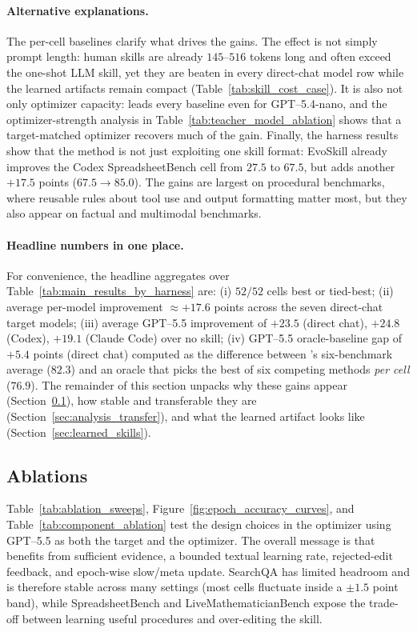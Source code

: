 \paragraph{Alternative explanations.}
The per-cell baselines clarify what drives the gains. The effect is not simply prompt length: human skills are already $145$--$516$ tokens long and often exceed the one-shot LLM skill, yet they are beaten in every direct-chat model row while the learned artifacts remain compact (Table~\ref{tab:skill_cost_case}). It is also not only optimizer capacity: \ourmethod{} leads every baseline even for GPT--5.4-nano, and the optimizer-strength analysis in Table~\ref{tab:teacher_model_ablation} shows that a target-matched optimizer recovers much of the gain. Finally, the harness results show that the method is not just exploiting one skill format: EvoSkill already improves the Codex SpreadsheetBench cell from $27.5$ to $67.5$, but \ourmethod{} adds another $+17.5$ points ($67.5{\to}85.0$). The gains are largest on procedural benchmarks, where reusable rules about tool use and output formatting matter most, but they also appear on factual and multimodal benchmarks.

\paragraph{Headline numbers in one place.}
For convenience, the headline aggregates over Table~\ref{tab:main_results_by_harness} are:
(i) \textbf{$52/52$} cells best or tied-best;
(ii) average per-model improvement $\approx +17.6$ points across the seven direct-chat target models;
(iii) average GPT--5.5 improvement of $+23.5$ (direct chat), $+24.8$ (Codex), $+19.1$ (Claude Code) over no skill;
(iv) GPT--5.5 oracle-baseline gap of $+5.4$ points (direct chat) computed as the difference between \ourmethod{}'s six-benchmark average ($82.3$) and an oracle that picks the best of six competing methods \emph{per cell} ($76.9$).
The remainder of this section unpacks why these gains appear (Section~\ref{sec:optimizer_ablation}), how stable and transferable they are (Section~\ref{sec:analysis_transfer}), and what the learned artifact looks like (Section~\ref{sec:learned_skills}).

\subsection{Ablations}
\label{sec:optimizer_ablation}

Table~\ref{tab:ablation_sweeps}, Figure~\ref{fig:epoch_accuracy_curves}, and Table~\ref{tab:component_ablation} test the design choices in the optimizer using GPT--5.5 as both the target and the optimizer. The overall message is that \ourmethod{} benefits from sufficient evidence, a bounded textual learning rate, rejected-edit feedback, and epoch-wise slow/meta update. SearchQA has limited headroom and is therefore stable across many settings (most cells fluctuate inside a $\pm1.5$ point band), while SpreadsheetBench and LiveMathematicianBench expose the trade-off between learning useful procedures and over-editing the skill.

